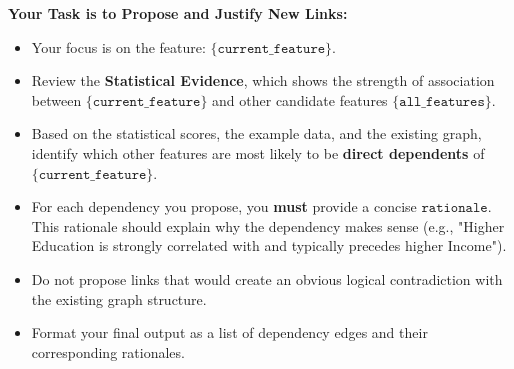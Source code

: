 \begin{tcolorbox}
\textbf{Your Task is to Propose and Justify New Links:}
\begin{itemize}[leftmargin=*, itemsep=2pt]
    \item Your focus is on the feature: $\texttt{\{current\_feature}\}$.
    \item Review the \textbf{Statistical Evidence}, which shows the strength of association between $\texttt{\{current\_feature\}}$ and other candidate features $\texttt{\{all\_features\}}$.
    \item Based on the statistical scores, the example data, and the existing graph, identify which other features are most likely to be \textbf{direct dependents} of $\texttt{\{current\_feature\}}$.
    \item For each dependency you propose, you \textbf{must} provide a concise $\texttt{rationale}$. This rationale should explain why the dependency makes sense (e.g., "Higher Education is strongly correlated with and typically precedes higher Income").
    \item Do not propose links that would create an obvious logical contradiction with the existing graph structure.
    \item Format your final output as a list of dependency edges and their corresponding rationales.
\end{itemize}

\label{prompt:generation}
\end{tcolorbox}

